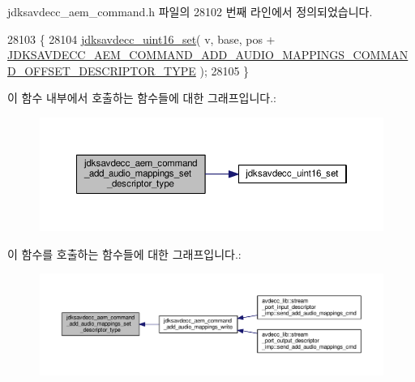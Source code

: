 jdksavdecc\+\_\+aem\+\_\+command.\+h 파일의 28102 번째 라인에서 정의되었습니다.


\begin{DoxyCode}
28103 \{
28104     \hyperlink{group__endian_ga14b9eeadc05f94334096c127c955a60b}{jdksavdecc\_uint16\_set}( v, base, pos + 
      \hyperlink{group__command__add__audio__mappings_ga5d998c3cb4c9e758353fd3078a52fc6d}{JDKSAVDECC\_AEM\_COMMAND\_ADD\_AUDIO\_MAPPINGS\_COMMAND\_OFFSET\_DESCRIPTOR\_TYPE}
       );
28105 \}
\end{DoxyCode}


이 함수 내부에서 호출하는 함수들에 대한 그래프입니다.\+:
\nopagebreak
\begin{figure}[H]
\begin{center}
\leavevmode
\includegraphics[width=350pt]{group__command__add__audio__mappings_gaeb2612b351fa37f00828eacbc44d875c_cgraph}
\end{center}
\end{figure}




이 함수를 호출하는 함수들에 대한 그래프입니다.\+:
\nopagebreak
\begin{figure}[H]
\begin{center}
\leavevmode
\includegraphics[width=350pt]{group__command__add__audio__mappings_gaeb2612b351fa37f00828eacbc44d875c_icgraph}
\end{center}
\end{figure}


